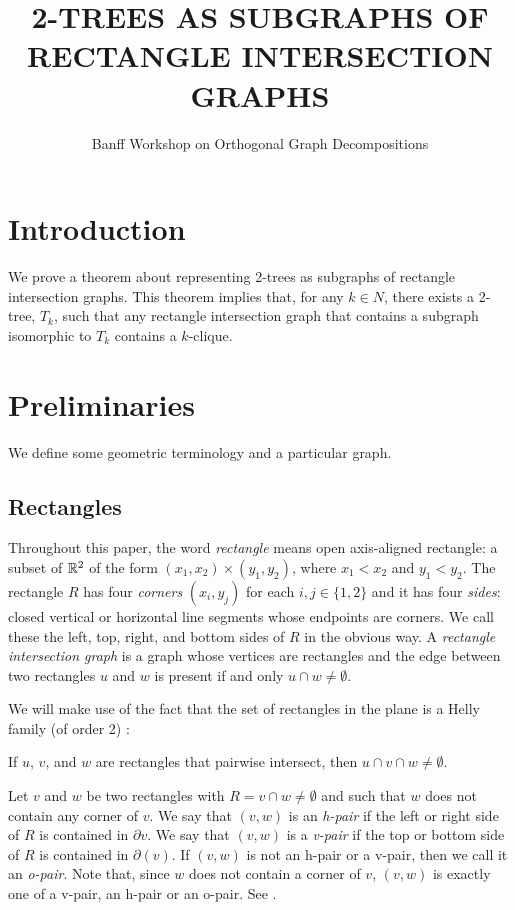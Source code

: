 \documentclass[lotsofwhite]{patmorin}
\title{\MakeUppercase{2-Trees as Subgraphs of Rectangle Intersection Graphs}}
\author{Banff Workshop on Orthogonal Graph Decompositions}
\begin{document}
\maketitle

\section{Introduction}

We prove a theorem about representing 2-trees as subgraphs of rectangle
intersection graphs.   This theorem implies that, for any $k\in N$,
there exists a 2-tree, $T_k$, such that any rectangle intersection graph that contains a subgraph isomorphic to $T_k$ contains a $k$-clique.

\section{Preliminaries}

We define some geometric terminology and a particular graph.

\subsection{Rectangles}

Throughout this paper, the word \emph{rectangle} means open axis-aligned
rectangle: a subset of $\mathbb{R}^2$ of the form $(x_1,x_2)\times (y_1,y_2)$,
where $x_1<x_2$ and $y_1<y_2$.  The rectangle $R$ has four \emph{corners}
$(x_i,y_j)$ for each $i,j\in\{1,2\}$ and it has four \emph{sides}: closed
vertical or horizontal line segments whose endpoints are corners.  We call
these the left, top, right, and bottom sides of $R$ in the obvious way.
A \emph{rectangle intersection graph} is a graph whose vertices are
rectangles and the edge between two rectangles $u$ and $w$ is present
if and only $u\cap w\neq \emptyset$.

We will make use of the fact that the set of rectangles in the plane is
a Helly family (of order 2) \cite{bollobas:combinatorics}:

\begin{obs}
   If $u$, $v$, and $w$ are rectangles that pairwise intersect, then
   $u\cap v\cap w\neq\emptyset$.
\end{obs}



Let $v$ and $w$ be two rectangles with $R=v\cap w\neq \emptyset$ and
such that $w$ does not contain any corner of $v$.  We say that $(v,w)$
is an \emph{h-pair} if the left or right side of $R$ is contained in
$\partial v$.  We say that $(v,w)$ is a \emph{v-pair} if the top or bottom
side of $R$ is contained in $\partial(v)$.  If $(v,w)$ is not an h-pair
or a v-pair, then we call it an \emph{o-pair}.  Note that, since $w$
does not contain a corner of $v$, $(v,w)$ is exactly one of a v-pair,
an h-pair or an o-pair. See .
\end{document}
